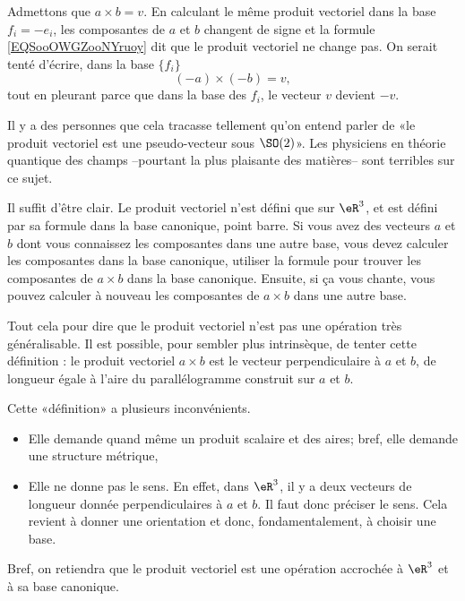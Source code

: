 \begin{normaltext}
	Admettons que \( a\times b=v\). En calculant le même produit vectoriel dans la base \( f_i=-e_i\), les composantes de \( a\) et \( b\) changent de signe et la formule \eqref{EQSooOWGZooNYruoy} dit que le produit vectoriel ne change pas. On serait tenté d'écrire, dans la base \( \{ f_i \}\)
	\begin{equation}
		(-a)\times (-b)=v,
	\end{equation}
	tout en pleurant parce que dans la base des \( f_i\), le vecteur \( v\) devient \( -v\).

	Il y a des personnes que cela tracasse tellement qu'on entend parler de «le produit vectoriel est une pseudo-vecteur sous \( \SO(2)\)». Les physiciens en théorie quantique des champs --pourtant la plus plaisante des matières-- sont terribles sur ce sujet.

	Il suffit d'être clair. Le produit vectoriel n'est défini que sur \( \eR^3\), et est défini par sa formule dans la base canonique, point barre. Si vous avez des vecteurs \( a\) et \( b\) dont vous connaissez les composantes dans une autre base, vous devez calculer les composantes dans la base canonique, utiliser la formule pour trouver les composantes de \( a\times b\) dans la base canonique. Ensuite, si ça vous chante, vous pouvez calculer à nouveau les composantes de \( a\times b\) dans une autre base.

	Tout cela pour dire que le produit vectoriel n'est pas une opération très généralisable. Il est possible, pour sembler plus intrinsèque, de tenter cette définition : le produit vectoriel \( a\times b\) est le vecteur perpendiculaire à \( a\) et \( b\), de longueur égale à l'aire du parallélogramme construit sur \( a\) et \( b\).

	Cette «définition» a plusieurs inconvénients.
	\begin{itemize}
		\item Elle demande quand même un produit scalaire et des aires; bref, elle demande une structure métrique,
		\item Elle ne donne pas le sens. En effet, dans \( \eR^3\), il y a deux vecteurs de longueur donnée perpendiculaires à \( a\) et \( b\). Il faut donc préciser le sens. Cela revient à donner une orientation et donc, fondamentalement, à choisir une base.
	\end{itemize}

	Bref, on retiendra que le produit vectoriel est une opération accrochée à \( \eR^3\) et à sa base canonique.
\end{normaltext}

